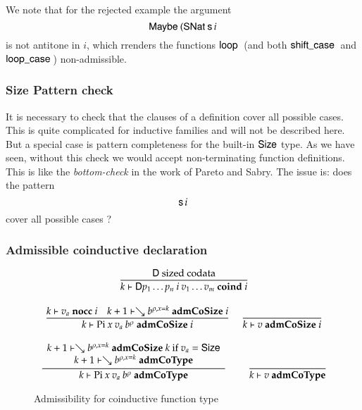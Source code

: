 We note that for the rejected example the argument \[\mathsf{Maybe}\: (\mathsf{SNat}\: \mathsf{s}\, i\] is not antitone in $i$, which rrenders the functions $\mathsf{loop}\:$ (and both $ \mathsf{shift\_case}\:$ and $\mathsf{loop\_case}\:$) non-admissible.

\subsubsection{Size Pattern check}
It is necessary to check that the clauses of a definition cover all possible cases.
This is quite complicated for inductive families and will not be described here.
But a special case is pattern completeness for the built-in $\mathsf{Size}$ type.
As we have seen, without this check we would accept non-terminating function definitions.
This is like the \emph{bottom-check} in the work of Pareto and Sabry.
The issue is: does the pattern \[ \mathsf{s}\, i \] cover all possible cases ? 

\subsubsection{Admissible coinductive declaration}

\begin{figure}[p]
\begin{gather*}
\ \dfrac{\mathsf{D} \mbox{ sized codata}}{k\vdash\mathsf{D} p_1 \ldots p_n \: i \: v_1 \ldots v_m\mbox{ \textbf{coind} }i}
\\[2ex]
\ \dfrac{k\vdash v_a\mbox{ \textbf{nocc} }i
\quad
k+1\vdash\searrow b^{\rho,x=k}\mbox{ \textbf{admCoSize} }i}{k\vdash\mathrm{Pi} \: x \: v_a \: b^{\rho}\mbox{ \textbf{admCoSize} }i}
\quad
\ \dfrac{}{k\vdash v\mbox{ \textbf{admCoSize} }i}
\\[2ex]
\ \dfrac{\begin{array}[b]{c}k+1\vdash\searrow b^{\rho,x=k}\mbox{ \textbf{admCoSize} }k \mbox{ if } v_a = \mathsf{Size}\\k+1\vdash\searrow b^{\rho,x=k}\mbox{ \textbf{admCoType}}\end{array}}{k\vdash\mathrm{Pi} \: x \: v_a \: b^{\rho}\mbox{ \textbf{admCoType}}}
\qquad
\ \dfrac{}{k\vdash v\mbox{ \textbf{admCoType}}}
\end{gather*}
\caption{Admissibility for coinductive function type}
\end{figure}

